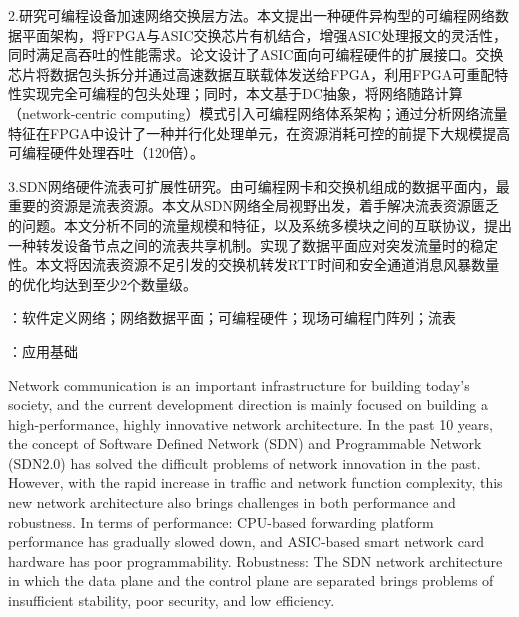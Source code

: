 2.研究可编程设备加速网络交换层方法。本文提出一种硬件异构型的可编程网络数据平面架构，将FPGA与ASIC交换芯片有机结合，增强ASIC处理报文的灵活性，同时满足高吞吐的性能需求。论文设计了ASIC面向可编程硬件的扩展接口。交换芯片将数据包头拆分并通过高速数据互联载体发送给FPGA，利用FPGA可重配特性实现完全可编程的包头处理；同时，本文基于DC抽象，将网络随路计算（network-centric computing）模式引入可编程网络体系架构；通过分析网络流量特征在FPGA中设计了一种并行化处理单元，在资源消耗可控的前提下大规模提高可编程硬件处理吞吐（120倍）。

3.SDN网络硬件流表可扩展性研究。由可编程网卡和交换机组成的数据平面内，最重要的资源是流表资源。本文从SDN网络全局视野出发，着手解决流表资源匮乏的问题。本文分析不同的流量规模和特征，以及系统多模块之间的互联协议，提出一种转发设备节点之间的流表共享机制。实现了数据平面应对突发流量时的稳定性。本文将因流表资源不足引发的交换机转发RTT时间和安全通道消息风暴数量的优化均达到至少2个数量级。



{\boldsong}
\vspace{\baselineskip}
：软件定义网络；网络数据平面；可编程硬件；现场可编程门阵列；流表

\vspace{\baselineskip}
：应用基础


\clearpage


%

\noindent Network communication is an important infrastructure for building today's society, and the current development direction is mainly focused on building a high-performance, highly innovative network architecture. In the past 10 years, the concept of Software Defined Network (SDN) and Programmable Network (SDN2.0) has solved the difficult problems of network innovation in the past. However, with the rapid increase in traffic and network function complexity, this new network architecture also brings challenges in both performance and robustness. In terms of performance: CPU-based forwarding platform performance has gradually slowed down, and ASIC-based smart network card hardware has poor programmability. Robustness: The SDN network architecture in which the data plane and the control plane are separated brings problems of insufficient stability, poor security, and low efficiency.\newline

